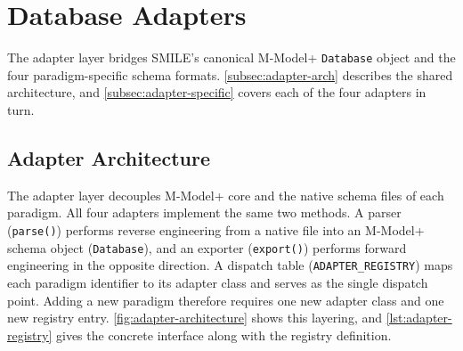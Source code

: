   \section{Database Adapters}\label{sec:adapters}

The adapter layer bridges SMILE's canonical M-Model+ \texttt{Database} object and the four paradigm-specific schema formats.
  \autoref{subsec:adapter-arch} describes the shared architecture, and                      \autoref{subsec:adapter-specific} covers each of the four adapters in                     turn.


  \subsection{Adapter Architecture}\label{subsec:adapter-arch}

 The adapter layer decouples M-Model+ core and the native schema
  files of each paradigm. All four adapters implement the same two
  methods. A parser (\texttt{parse()}) performs reverse engineering
  from a native file into an M-Model+ schema object (\texttt{Database}),                       and an exporter (\texttt{export()}) performs forward engineering in
  the opposite direction. A dispatch table (\texttt{ADAPTER\_REGISTRY})   maps each paradigm identifier to its adapter class and serves as the  single dispatch point. Adding a new paradigm therefore requires one  new adapter class and one new registry entry.                                                                                                \autoref{fig:adapter-architecture} shows this layering, and                                \autoref{lst:adapter-registry} gives the concrete interface along
  with the registry definition.


